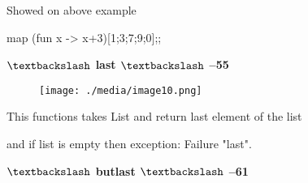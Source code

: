 \documentclass[12pt]{article}
\renewcommand{\_}{\kern-1.5pt\textunderscore\kern-1.5pt}
\begin{document}

\par


\vspace{\baselineskip}

\vspace{\baselineskip}
{\fontsize{14pt}{16.8pt}\selectfont Showed on above example\par}\par

{\fontsize{14pt}{16.8pt}\selectfont map (fun x -> x+3)[1;3;7;9;0];;\par}\par


\vspace{\baselineskip}
{\fontsize{14pt}{16.8pt}\selectfont [4; 6; 10; 12; 3]\par}\par


\vspace{\baselineskip}
{\fontsize{14pt}{16.8pt}\selectfont \textbf{$\textbackslash$  last $\textbackslash$ --55}\par}\par




\begin{figure}[H]
	\begin{Center}
		\texttt{[image: ./media/image10.png]}
	\end{Center}
\end{figure}



\par


\vspace{\baselineskip}
{\fontsize{14pt}{16.8pt}\selectfont This functions takes List and return last element of the list\par}\par

{\fontsize{14pt}{16.8pt}\selectfont and if list is empty then exception: Failure "last".\par}\par


\vspace{\baselineskip}

\vspace{\baselineskip}
{\fontsize{14pt}{16.8pt}\selectfont \textbf{$\textbackslash$  butlast $\textbackslash$  --61}\par}\par
\end{document}
